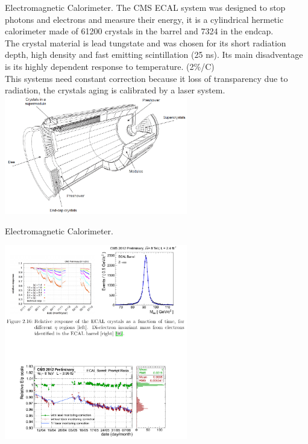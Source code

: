 \documentclass[8pt]{beamer}
\begin{document}
\begin{frame}[fragile]{Electromagnetic Calorimeter.}
	The CMS ECAL system was designed to stop photons and electrons and measure their energy, it is a cylindrical hermetic calorimeter made of 61200 crystals in the barrel and 7324 in the endcap.\\
	The crystal material is lead tungstate and was chosen for its short radiation depth, high density and fast emitting scintillation (25 ns). Its main disadventage is its highly dependent response to temperature. (2\%/C)
	\\
	This systems need constant correction because it loss of transparency due to radiation, the crystals aging is calibrated by a laser system.
	\centering
	\includegraphics[width=8cm]{13}

\end{frame}


\begin{frame}[fragile]{Electromagnetic Calorimeter.}
	
	\centering
	\includegraphics[width=8cm]{14}
	
\end{frame}
\end{document}
